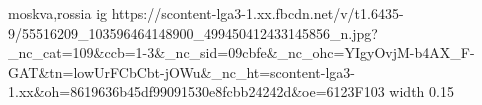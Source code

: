  
 
 
 
 

\par
moskva,rossia
\ifcmt
  ig https://scontent-lga3-1.xx.fbcdn.net/v/t1.6435-9/55516209_103596464148900_499450412433145856_n.jpg?_nc_cat=109&ccb=1-3&_nc_sid=09cbfe&_nc_ohc=YIgyOvjM-b4AX_F-GAT&tn=lowUrFCbCbt-jOWu&_nc_ht=scontent-lga3-1.xx&oh=8619636b45df99091530e8fcbb24242d&oe=6123F103
  width 0.15
\fi

